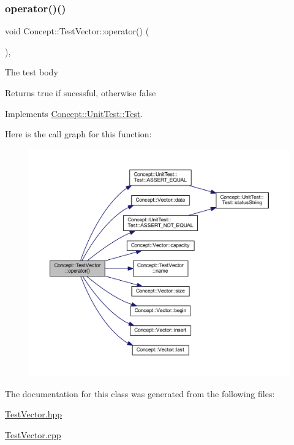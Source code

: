 \subsubsection{\texorpdfstring{operator()()}{operator()()}}
{\footnotesize\ttfamily void Concept\+::\+Test\+Vector\+::operator() (\begin{DoxyParamCaption}{ }\end{DoxyParamCaption})\hspace{0.3cm}{\ttfamily [override]}, {\ttfamily [virtual]}}

The test body \begin{DoxyReturn}{Returns}
true if sucessful, otherwise false 
\end{DoxyReturn}


Implements \mbox{\hyperlink{class_concept_1_1_unit_test_1_1_test_aa8c081714f642696eeef640911be752a}{Concept\+::\+Unit\+Test\+::\+Test}}.

Here is the call graph for this function\+:\nopagebreak
\begin{figure}[H]
\begin{center}
\leavevmode
\includegraphics[width=350pt]{class_concept_1_1_test_vector_ac53c3efce4e5a4adad27e65d5486313d_cgraph}
\end{center}
\end{figure}


The documentation for this class was generated from the following files\+:\begin{DoxyCompactItemize}
\item 
\mbox{\hyperlink{_test_vector_8hpp}{Test\+Vector.\+hpp}}\item 
\mbox{\hyperlink{_test_vector_8cpp}{Test\+Vector.\+cpp}}\end{DoxyCompactItemize}
